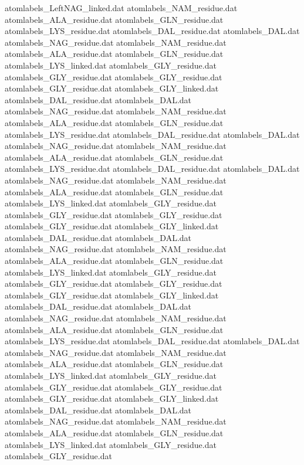 atomlabels_LeftNAG_linked.dat   
atomlabels_NAM_residue.dat      
atomlabels_ALA_residue.dat      
atomlabels_GLN_residue.dat      
atomlabels_LYS_residue.dat      
atomlabels_DAL_residue.dat      
atomlabels_DAL.dat              
atomlabels_NAG_residue.dat      
atomlabels_NAM_residue.dat      
atomlabels_ALA_residue.dat      
atomlabels_GLN_residue.dat      
atomlabels_LYS_linked.dat       
atomlabels_GLY_residue.dat
atomlabels_GLY_residue.dat
atomlabels_GLY_residue.dat
atomlabels_GLY_residue.dat
atomlabels_GLY_linked.dat
atomlabels_DAL_residue.dat      
atomlabels_DAL.dat              
atomlabels_NAG_residue.dat      
atomlabels_NAM_residue.dat      
atomlabels_ALA_residue.dat      
atomlabels_GLN_residue.dat      
atomlabels_LYS_residue.dat      
atomlabels_DAL_residue.dat      
atomlabels_DAL.dat              
atomlabels_NAG_residue.dat      
atomlabels_NAM_residue.dat      
atomlabels_ALA_residue.dat      
atomlabels_GLN_residue.dat      
atomlabels_LYS_residue.dat      
atomlabels_DAL_residue.dat      
atomlabels_DAL.dat              
atomlabels_NAG_residue.dat      
atomlabels_NAM_residue.dat      
atomlabels_ALA_residue.dat      
atomlabels_GLN_residue.dat      
atomlabels_LYS_linked.dat       
atomlabels_GLY_residue.dat
atomlabels_GLY_residue.dat
atomlabels_GLY_residue.dat
atomlabels_GLY_residue.dat
atomlabels_GLY_linked.dat
atomlabels_DAL_residue.dat      
atomlabels_DAL.dat              
atomlabels_NAG_residue.dat      
atomlabels_NAM_residue.dat      
atomlabels_ALA_residue.dat      
atomlabels_GLN_residue.dat      
atomlabels_LYS_linked.dat       
atomlabels_GLY_residue.dat
atomlabels_GLY_residue.dat
atomlabels_GLY_residue.dat
atomlabels_GLY_residue.dat
atomlabels_GLY_linked.dat
atomlabels_DAL_residue.dat      
atomlabels_DAL.dat              
atomlabels_NAG_residue.dat      
atomlabels_NAM_residue.dat      
atomlabels_ALA_residue.dat      
atomlabels_GLN_residue.dat      
atomlabels_LYS_residue.dat      
atomlabels_DAL_residue.dat      
atomlabels_DAL.dat              
atomlabels_NAG_residue.dat      
atomlabels_NAM_residue.dat      
atomlabels_ALA_residue.dat      
atomlabels_GLN_residue.dat      
atomlabels_LYS_linked.dat       
atomlabels_GLY_residue.dat
atomlabels_GLY_residue.dat
atomlabels_GLY_residue.dat
atomlabels_GLY_residue.dat
atomlabels_GLY_linked.dat
atomlabels_DAL_residue.dat      
atomlabels_DAL.dat              
atomlabels_NAG_residue.dat      
atomlabels_NAM_residue.dat      
atomlabels_ALA_residue.dat      
atomlabels_GLN_residue.dat      
atomlabels_LYS_linked.dat       
atomlabels_GLY_residue.dat
atomlabels_GLY_residue.dat
